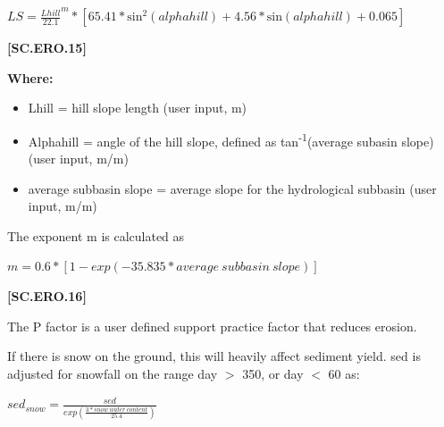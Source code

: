     \begin{center}
 \(LS= \frac{Lhill}{22.1}^m * [65.41 * \text{sin}^2(alphahill) + 4.56 * \text{sin}(alphahill)+0.065]\)
    \end{center}
        \vspace{0.5cm} 
    
            {\raggedleft \textbf{[SC.ERO.15]}\par}
            \vspace{0.5cm}

        \textbf{Where:}
            
        \begin{itemize}
            \item Lhill		=	hill slope length (user input, m)
            \item Alphahill	=	angle of the hill slope, defined as tan\textsuperscript{-1}(average subasin slope) (user input, m/m)
            \item average subbasin slope = average slope for the hydrological subbasin (user input, m/m)
        \end{itemize}
    \vspace{0.2cm}

The exponent m is calculated as 
            \vspace{0.5cm}
            
    \begin{center}
 \(m=0.6 * [1-exp(-35.835 * average\ subbasin\ slope)]	\)
    \end{center}
        \vspace{0.5cm} 
    
            {\raggedleft \textbf{[SC.ERO.16]}\par}
            \vspace{0.5cm}

The P factor is a user defined support practice factor that reduces erosion. 
\vspace{0.2cm}

If there is snow on the ground, this will heavily affect sediment yield. sed is adjusted for snowfall on the range day \(>\) 350, or day \(<\) 60 as:
            \vspace{0.5cm}
            
    \begin{center}
 \(sed_{snow}=\frac{sed}{exp(\frac{3 * snow\ water\ content}{25.4})}\)
    \end{center}
        \vspace{0.5cm} 
    
